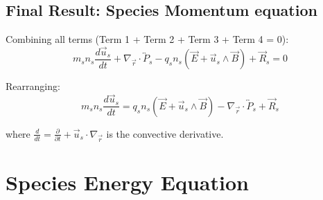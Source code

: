 \subsection{Final Result: Species Momentum equation}

Combining all terms (Term 1 + Term 2 + Term 3 + Term 4 = 0):
\begin{equation*}
m_s n_s \frac{d\vec{u}_s}{dt} + \nabla_{\vec{r}} \cdot \overleftrightarrow{P}_s - q_s n_s (\vec{E} + \vec{u}_s \wedge \vec{B}) + \vec{R}_s = 0
\end{equation*}

Rearranging:
\begin{equation*}
 m_s n_s \frac{d\vec{u}_s}{dt} = q_s n_s (\vec{E} + \vec{u}_s \wedge \vec{B}) - \nabla_{\vec{r}} \cdot \overleftrightarrow{P}_s + \vec{R}_s
\end{equation*}

where $\frac{d}{dt} = \frac{\partial}{\partial t} + \vec{u}_s \cdot \nabla_{\vec{r}}$ is the convective derivative.


\section{Species Energy Equation}